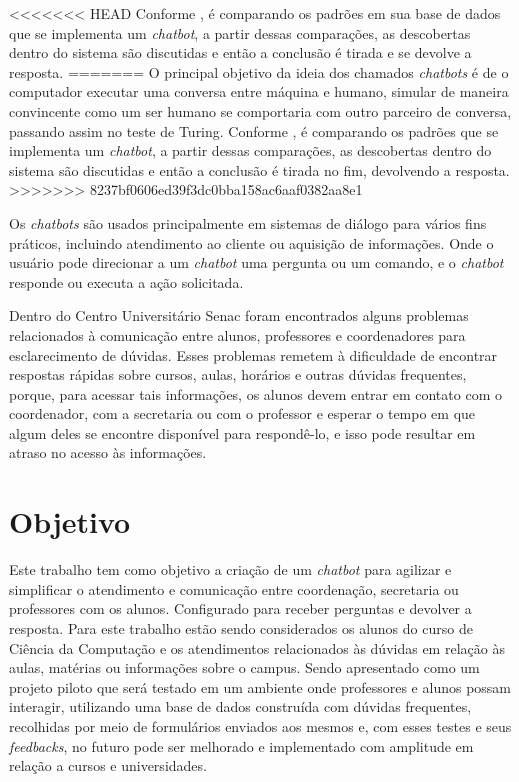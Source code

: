 \documentclass[
	12pt,				%
	oneside,
	a4paper,			%
	english,			%
	french,				%
	spanish,			%
	brazil				%
	]{abntex2}
\begin{document}
<<<<<<< HEAD
Conforme \textcite{dahiya}, é comparando os padrões em sua base de dados que se implementa um \emph{chatbot}, a partir dessas comparações, as descobertas dentro do sistema são discutidas e então a conclusão é tirada e se devolve a resposta.
=======
O principal objetivo da ideia dos chamados \emph{chatbots} é de o computador executar uma conversa entre máquina e humano, simular de maneira convincente como um ser humano se comportaria com outro parceiro de conversa, passando assim no teste de Turing.  
Conforme \textcite{dahiya}, é comparando os padrões que se implementa um \emph{chatbot}, a partir dessas comparações, as descobertas dentro do sistema são discutidas e então a conclusão é tirada no fim, devolvendo a resposta.
>>>>>>> 8237bf0606ed39f3dc0bba158ac6aaf0382aa8e1
 
Os \emph{chatbots} são usados principalmente em sistemas de diálogo para vários fins práticos, incluindo atendimento ao cliente ou aquisição de informações. Onde o usuário pode direcionar a um \emph{chatbot} uma pergunta ou um comando, e o \emph{chatbot} responde ou executa a ação solicitada.

Dentro do Centro Universitário Senac foram encontrados alguns problemas relacionados à comunicação entre alunos, professores e coordenadores para esclarecimento de dúvidas. Esses problemas remetem à dificuldade de encontrar respostas rápidas sobre cursos, aulas, horários e outras dúvidas frequentes, porque, para acessar tais informações, os alunos devem entrar em contato com o coordenador, com a secretaria ou com o professor e esperar o tempo em que algum deles se encontre disponível para respondê-lo, e isso pode resultar em atraso no acesso às informações.  


\section{Objetivo}

Este trabalho tem como objetivo a criação de um \emph{chatbot} para agilizar e simplificar o atendimento e comunicação entre coordenação, secretaria ou professores com os alunos. Configurado para receber perguntas e devolver a resposta.
Para este trabalho estão sendo considerados os alunos do curso de Ciência da Computação e os atendimentos relacionados às dúvidas em relação às aulas, matérias ou informações sobre o campus.
Sendo apresentado como um projeto piloto que será testado em um ambiente onde professores e alunos possam interagir, utilizando uma base de dados construída com dúvidas frequentes, recolhidas por meio de formulários enviados aos mesmos e, com esses testes e seus \emph{feedbacks}, no futuro pode ser melhorado e implementado com amplitude em relação a cursos e universidades.
\end{document}
